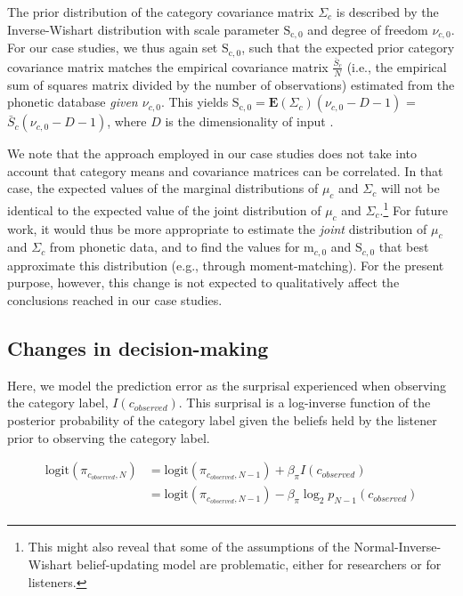 \documentclass[
  11pt,
  man,floatsintext]{apa6}
\begin{document}
The prior distribution of the category covariance matrix \(\Sigma_c\) is described by the Inverse-Wishart distribution with scale parameter \(\mathrm{S_{c,0}}\) and degree of freedom \(\nu_{c,0}\). For our case studies, we thus again set \(\mathrm{S_{c,0}}\), such that the expected prior category covariance matrix matches the empirical covariance matrix \(\frac{\bar{S}_c}{N}\) (i.e., the empirical sum of squares matrix divided by the number of observations) estimated from the phonetic database \emph{given \(\nu_{c,0}\)}. This yields \(\mathrm{S_{c,0}} = \mathbf{E}(\Sigma_c)(\nu_{c,0}-D-1)\) = \(\bar{S}_c(\nu_{c,0}-D-1)\), where \(D\) is the dimensionality of input \autocite[i.e., the number of phonetic cues considered, cf.][134-5]{murphy2012}.

We note that the approach employed in our case studies does not take into account that category means and covariance matrices can be correlated. In that case, the expected values of the marginal distributions of \(\mu_c\) and \(\Sigma_c\) will not be identical to the expected value of the joint distribution of \(\mu_c\) and \(\Sigma_c\).\footnote{This might also reveal that some of the assumptions of the Normal-Inverse-Wishart belief-updating model are problematic, either for researchers or for listeners.} For future work, it would thus be more appropriate to estimate the \emph{joint} distribution of \(\mu_c\) and \(\Sigma_c\) from phonetic data, and to find the values for \(\mathrm{m}_{c,0}\) and \(\mathrm{S}_{c,0}\) that best approximate this distribution (e.g., through moment-matching). For the present purpose, however, this change is not expected to qualitatively affect the conclusions reached in our case studies.

\subsection{Changes in decision-making}\label{sec:SI-models-changes-in-decision-making}

Here, we model the prediction error as the surprisal experienced when observing the category label, \(I(c_{observed})\). This surprisal is a log-inverse function of the posterior probability of the category label given the beliefs held by the listener prior to observing the category label.

\begin{equation}\label{eq:bias-updating}
\begin{split}
\mathrm{logit}(\pi_{c_{observed},N}) & = \mathrm{logit}(\pi_{c_{observed},N-1}) + \beta_{\pi} I(c_{observed}) \\
                          & = \mathrm{logit}(\pi_{c_{observed},N-1}) - \beta_{\pi} \log_2 p_{N-1}(c_{observed}) \\
\end{split}
\end{equation}
\end{document}
